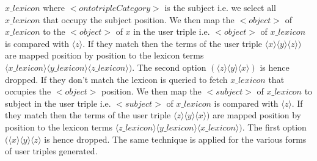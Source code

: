 \documentclass[review]{elsarticle}
\begin{document}
$x\_lexicon$ where $<ontotripleCategory>$ is the subject i.e. we  select all $x\_lexicon$ that occupy the subject position. We then map the  $<object>$ of $x\_lexicon$ to the $<object>$ of $ x$ in the user triple i.e. $<object>$ of $x\_lexicon$ is compared with  $\langle z\rangle$. If they match then the terms of the user triple $\langle x\rangle\langle y\rangle\langle z\rangle)$ are mapped position by position to the lexicon terms $\langle x\_lexicon\rangle\langle y\_lexicon\rangle\langle z\_lexicon\rangle)$. The second option $( \langle z\rangle\langle y\rangle\langle x\rangle) $ is hence dropped. If they don't match  the lexicon is queried to fetch $x\_lexicon$  that occupies the $<object>$  position.  We then map the  $<subject>$ of $x\_lexicon$ to subject  in the user triple i.e. $<subject>$ of $x\_lexicon$ is compared with  $\langle z\rangle$. If they match  then the terms of the user triple $\langle z\rangle\langle y\rangle\langle x\rangle)$ are mapped position by position to the lexicon terms $\langle z\_lexicon\rangle\langle y\_lexicon\rangle\langle x\_lexicon\rangle)$. The first option $( \langle x\rangle\langle y\rangle\langle z\rangle $ is hence dropped. The same technique is applied for the various forms of user triples generated.
\end{document}
